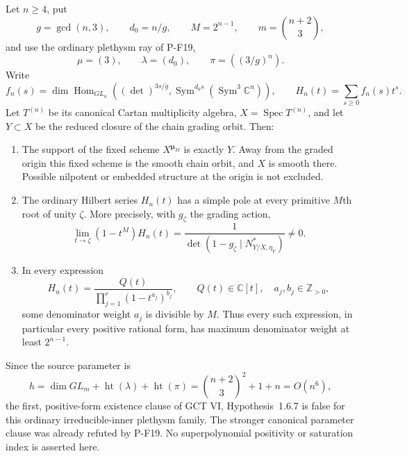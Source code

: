 \begin{theorem}
\label{thm:actualcubicpole}
Let $n\ge4$, put
\[
 g=\gcd(n,3),\qquad d_0=n/g,\qquad
 M=2^{n-1},\qquad m=\binom{n+2}{3},
\]
and use the ordinary plethysm ray of P-F19,
\[
 \mu=(3),\qquad \lambda=(d_0),\qquad
 \pi=((3/g)^n).
\]
Write
\[
 f_n(s)=\dim\operatorname{Hom}_{GL_n}
 \left((\det)^{3s/g},\operatorname{Sym}^{d_0s}
                    (\operatorname{Sym}^3\mathbb C^n)\right),
 \qquad
 H_n(t)=\sum_{s\ge0}f_n(s)t^s.
 \tag{P-F31a}
\]
Let $T^{(n)}$ be its canonical Cartan multiplicity algebra,
$X=\operatorname{Spec}T^{(n)}$, and let $Y\subset X$ be the
reduced closure of the chain grading orbit. Then:

\begin{enumerate}
\item The support of the fixed scheme $X^{\boldsymbol\mu_M}$
is exactly $Y$. Away from the graded origin this fixed scheme
is the smooth chain orbit, and $X$ is smooth there. Possible
nilpotent or embedded structure at the origin is not excluded.
\item The ordinary Hilbert series $H_n(t)$ has a simple pole
at every primitive $M$th root of unity $\zeta$. More precisely,
with $g_\zeta$ the grading action,
\[
 \lim_{t\to\zeta}(1-t^M)H_n(t)
   =\frac{1}{\det(1-g_\zeta\mid N^*_{Y/X,\eta_Y})}
   \ne0.
 \tag{P-F31b}
\]
\item In every expression
\[
 H_n(t)=\frac{Q(t)}{\prod_{j=1}^{r}(1-t^{a_j})^{b_j}},
 \qquad Q(t)\in\mathbb C[t],\quad a_j,b_j\in\mathbb Z_{>0},
 \tag{P-F31c}
\]
some denominator weight $a_j$ is divisible by $M$. Thus every
such expression, in particular every positive rational form,
has maximum denominator weight at least $2^{n-1}$.
\end{enumerate}
Since the source parameter is
\[
 h=\dim GL_m+\operatorname{ht}(\lambda)+\operatorname{ht}(\pi)
   =\binom{n+2}{3}^{\!2}+1+n=O(n^6),
 \tag{P-F31d}
\]
the first, positive-form existence clause of GCT VI,
Hypothesis~1.6.7 is false for this ordinary irreducible-inner
plethysm family. The stronger canonical parameter clause was
already refuted by P-F19. No superpolynomial positivity or
saturation index is asserted here.
\end{theorem}

